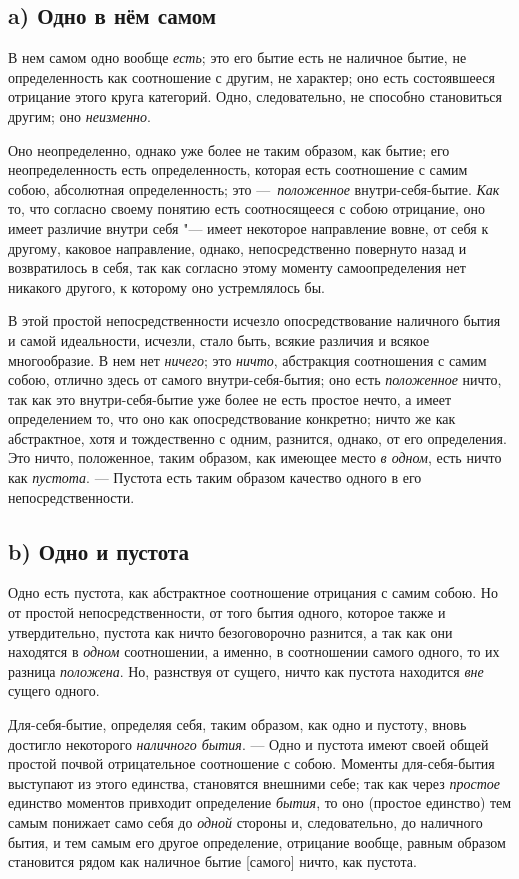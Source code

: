 \subsection*{a) Одно в нём самом}
В нем самом одно вообще {\em есть}; это его бытие есть
не наличное бытие, не определенность как соотношение с другим, не характер;
оно есть состоявшееся отрицание этого круга категорий. Одно, следовательно,
не способно становиться другим; оно {\em неизменно}.

Оно неопределенно, однако уже более не таким образом, как бытие; его
неопределенность есть определенность, которая есть соотношение с самим
собою, абсолютная определенность; это
—~{\em положенное} внутри-себя-бытие.
{\em Как} то, что согласно своему понятию есть
соотносящееся с собою отрицание, оно имеет различие внутри себя "--- имеет
некоторое направление вовне, от себя к другому, каковое направление,
однако, непосредственно повернуто назад и возвратилось в себя, так как
согласно этому моменту самоопределения нет никакого другого, к которому оно
устремлялось бы.

В этой простой непосредственности исчезло опосредствование наличного бытия и
самой идеальности, исчезли, стало быть, всякие различия и всякое
многообразие. В нем нет {\em ничего}; это
{\em ничто}, абстракция соотношения с самим собою,
отлично здесь от самого внутри-себя-бытия; оно есть
{\em положенное} ничто, так как это внутри-себя-бытие
уже более не есть простое нечто, а имеет определением то, что оно как
опосредствование конкретно; ничто же как абстрактное, хотя и тождественно с
одним, разнится, однако, от его определения. Это ничто, положенное, таким
образом, как имеющее место {\em в одном}, есть ничто
как {\em пустота}. — Пустота есть таким образом
качество одного в его непосредственности.

\subsection*{b) Одно и пустота}
Одно есть пустота, как абстрактное соотношение отрицания с самим собою. Но
от простой непосредственности, от того бытия одного, которое также и
утвердительно, пустота как ничто безоговорочно разнится, а так как они
находятся в {\em одном} соотношении, а именно, в
соотношении самого одного, то их разница
{\em положена}. Но, разнствуя от сущего, ничто как
пустота находится {\em вне} сущего одного.

Для-себя-бытие, определяя себя, таким образом, как одно и пустоту, вновь
достигло некоторого {\em наличного бытия}. — Одно и
пустота имеют своей общей простой почвой отрицательное соотношение с собою.
Моменты для-себя-бытия выступают из этого единства, становятся внешними
себе; так как через {\em простое} единство моментов
привходит определение {\em бытия}, то оно (простое
единство) тем самым понижает само себя до {\em одной}
стороны и, следовательно, до наличного бытия, и тем самым его другое
определение, отрицание вообще, равным образом становится рядом как наличное
бытие [самого] ничто, как пустота.

